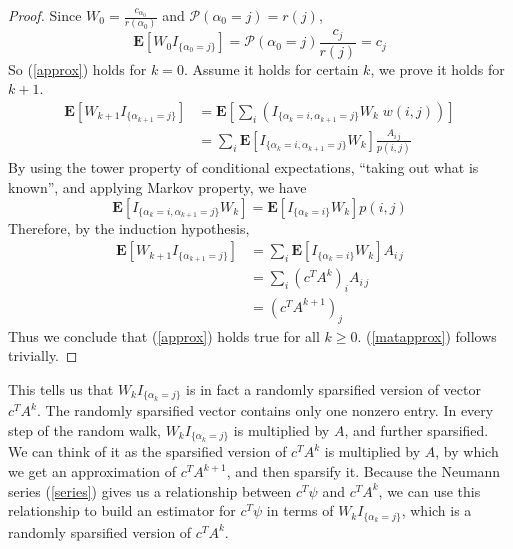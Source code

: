 \documentclass{elsart}
\theoremstyle{remark}
\theoremstyle{definition}
\theoremstyle{proof}
\newtheorem{proof}[theorem]{Proof}
\begin{document}
        \begin{proof}
            Since $W_0 = \frac{c_{\alpha_0}}{r(\alpha_0)}$ and
            $\mathcal{P}(\alpha_0 = j) = r(j)$,
            \[ \mathbf{E}[W_0 I_{\{\alpha_0 = j\}}]
                = \mathcal{P}(\alpha_0 = j) \frac{c_j}{r(j)} = c_j
            \]
            So (\ref{approx}) holds for $k=0$.  Assume it holds for certain $k$,
            we prove it holds for $k+1$.
            \[ \begin{split}
                \mathbf{E}[W_{k+1} I_{\{\alpha_{k+1} = j\}}]
                &= \mathbf{E}\left[ \sum_i \left( I_{\{\alpha_k = i,
                    \alpha_{k+1} = j\}} W_k \; w(i,j) \right)\right] \\
                &= \sum_i \mathbf{E}\left[ I_{\{\alpha_k = i,
                    \alpha_{k+1} = j\}} W_k \right] \frac{A_{i\,j}}{p(i,j)}
            \end{split} \]
            By using the tower property of conditional expectations,
            ``taking out what is known'', and applying Markov property, we have
            \[ \mathbf{E}\left[ I_{\{\alpha_k = i,
                                     \alpha_{k+1} = j\}} W_k \right]
                = \mathbf{E}\left[ I_{\{\alpha_k = i\}} W_k \right] p(i,j)
            \]
            Therefore, by the induction hypothesis,
            \[ \begin{split}
                \mathbf{E}[W_{k+1} I_{\{\alpha_{k+1} = j\}}]
                &= \sum_i \mathbf{E}\left[ I_{\{\alpha_k = i\}} W_k \right]
                          A_{i\,j} \\
                &= \sum_i  \left(c^T A^k\right)_i A_{i\,j} \\
                &= \left(c^T A^{k+1}\right)_j
            \end{split} \]
            Thus we conclude that (\ref{approx}) holds true for all
            $k\ge 0$. (\ref{matapprox}) follows trivially.
        \end{proof}
        This tells us that $W_k I_{\{\alpha_k = j\}}$ is in fact a randomly
        sparsified version of vector $c^T A^k$.  The randomly sparsified
        vector contains only one nonzero entry.  In every step of the random
        walk, $W_k I_{\{\alpha_k = j\}}$ is multiplied by $A$, and further
        sparsified. We can think of it as the sparsified version of $c^T A^k$
        is multiplied by $A$, by which we get an approximation of
        $c^T A^{k+1}$, and then sparsify it.  Because the Neumann series
        (\ref{series}) gives us a relationship between $c^T\psi$ and
        $c^T A^k$, we can use this relationship to build an estimator
        for $c^T \psi$ in terms of $W_k I_{\{\alpha_k = j\}}$, which is
        a randomly sparsified version of $c^T A^k$.
        
\end{document}
